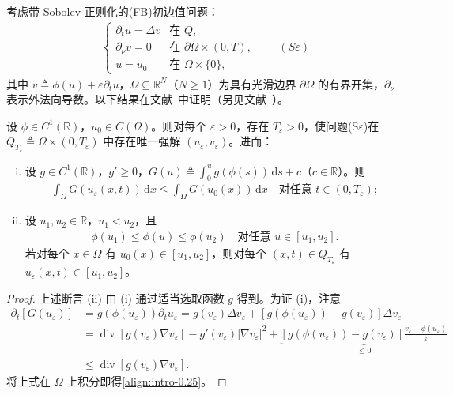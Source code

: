 \documentclass[../main.tex]{subfiles}
\begin{document}
考虑带 Sobolev 正则化的(FB)初边值问题：
\begin{align*}
\begin{cases}
\partial_t u = \Delta v & \text{在 }Q,\\
\partial_\nu v = 0 & \text{在 }\partial\Omega\times(0,T),\\
u=u_0 & \text{在 }\Omega\times\{0\},
\end{cases}
\qquad(S\varepsilon)
\end{align*}
其中 $v\triangleq \phi(u)+\varepsilon\partial_t u$，$\Omega\subseteq\mathbb{R}^N$（$N\geqslant1$）为具有光滑边界 $\partial\Omega$ 的有界开集，$\partial_\nu$ 表示外法向导数。以下结果在文献~\cite{ref74}中证明（另见文献~\cite{ref76}）。

\begin{lemma}\label{lemma:intro-0.3.1}
设 $\phi\in C^1(\mathbb{R})$，$u_0\in C(\Omega)$。则对每个 $\varepsilon>0$，存在 $T_\varepsilon>0$，使问题(S$\varepsilon$)在 $Q_{T_\varepsilon}\triangleq \Omega\times(0,T_\varepsilon)$ 中存在唯一强解 $(u_\varepsilon,v_\varepsilon)$。进而：
\begin{enumerate}[(i)]
\item\label{item:intro-0.3.1-i} 设 $g\in C^1(\mathbb{R})$，$g'\geqslant0$，$G(u)\triangleq \int_0^u g(\phi(s))\,\mathrm{d}s+c$（$c\in\mathbb{R}$）。则
\begin{align}
\int_\Omega G(u_\varepsilon(x,t))\,\mathrm{d}x \leqslant \int_\Omega G(u_0(x))\,\mathrm{d}x
\quad \text{对任意 }t\in(0,T_\varepsilon); \label{align:intro-0.25}
\end{align}
\item\label{item:intro-0.3.1-ii} 设 $u_1,u_2\in\mathbb{R}$，$u_1<u_2$，且
\begin{align}
\phi(u_1)\leqslant\phi(u)\leqslant\phi(u_2) \quad \text{对任意 }u\in[u_1,u_2]. \label{align:intro-0.26}
\end{align}
若对每个 $x\in\Omega$ 有 $u_0(x)\in[u_1,u_2]$，则对每个 $(x,t)\in Q_{T_\varepsilon}$ 有 $u_\varepsilon(x,t)\in[u_1,u_2]$。
\end{enumerate}
\end{lemma}

\begin{proof}
上述断言 (ii) 由 (i) 通过适当选取函数 $g$ 得到。为证 (i)，注意
\begin{align*}
\partial_t[G(u_\varepsilon)]
&= g(\phi(u_\varepsilon))\partial_t u_\varepsilon
= g(v_\varepsilon)\Delta v_\varepsilon + [g(\phi(u_\varepsilon))-g(v_\varepsilon)]\Delta v_\varepsilon\\
&= \operatorname{div}[g(v_\varepsilon)\nabla v_\varepsilon] - g'(v_\varepsilon)|\nabla v_\varepsilon|^2
+ \underbrace{[g(\phi(u_\varepsilon))-g(v_\varepsilon)]\frac{v_\varepsilon-\phi(u_\varepsilon)}{\varepsilon}}_{\leqslant0}\\
&\leqslant \operatorname{div}[g(v_\varepsilon)\nabla v_\varepsilon].
\end{align*}
将上式在 $\Omega$ 上积分即得\eqref{align:intro-0.25}。
\end{proof}
\end{document}
